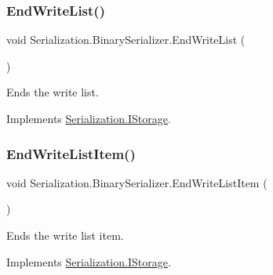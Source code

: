 \subsubsection{\texorpdfstring{End\+Write\+List()}{EndWriteList()}}
{\footnotesize\ttfamily void Serialization.\+Binary\+Serializer.\+End\+Write\+List (\begin{DoxyParamCaption}{ }\end{DoxyParamCaption})\hspace{0.3cm}{\ttfamily [inline]}}



Ends the write list. 



Implements \hyperlink{interface_serialization_1_1_i_storage_a1698725786d0d7d7360a8ead45ebe3ea}{Serialization.\+I\+Storage}.

\mbox{\label{class_serialization_1_1_binary_serializer_aa0099aa23887ecaba8eee43f474fed04}} 
\subsubsection{\texorpdfstring{End\+Write\+List\+Item()}{EndWriteListItem()}}
{\footnotesize\ttfamily void Serialization.\+Binary\+Serializer.\+End\+Write\+List\+Item (\begin{DoxyParamCaption}{ }\end{DoxyParamCaption})\hspace{0.3cm}{\ttfamily [inline]}}



Ends the write list item. 



Implements \hyperlink{interface_serialization_1_1_i_storage_a996ec10cec9f039c84f059ab511dce31}{Serialization.\+I\+Storage}.

\mbox{\label{class_serialization_1_1_binary_serializer_afa2c3e312cbe5f67a4b963cb0dadaa75}} 
